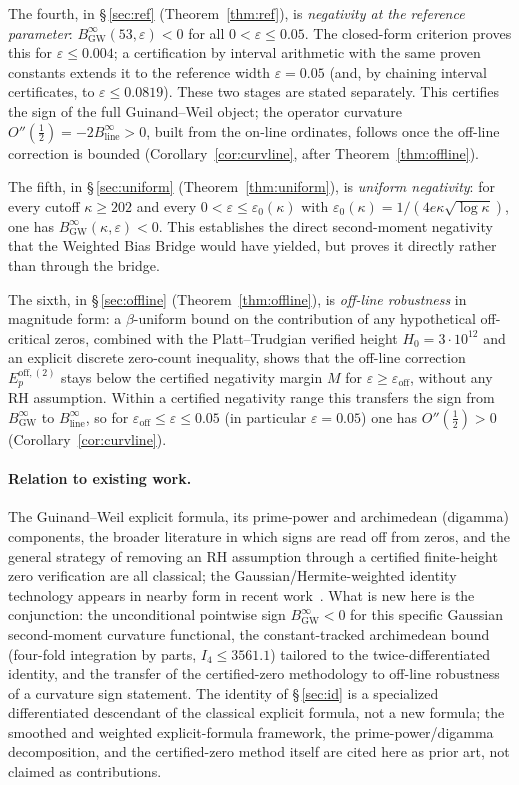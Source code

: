 \documentclass[11pt]{article}
\newcommand{\BinfGW}{B_{\mathrm{GW}}^{\infty}}   %
\newcommand{\Binfline}{B_{\mathrm{line}}^{\infty}} %
\newcommand{\Eoff}{E_p^{\mathrm{off},(2)}}  %
\begin{document}
The fourth, in \S\,\ref{sec:ref} (Theorem~\ref{thm:ref}), is
\emph{negativity at the reference parameter}: $\BinfGW(53,\varepsilon)<0$ for
all $0<\varepsilon\le 0.05$.
The closed-form criterion proves this for $\varepsilon\le 0.004$; a
certification by interval arithmetic with the same proven constants extends
it to the reference width $\varepsilon=0.05$ (and, by chaining interval
certificates, to $\varepsilon\le 0.0819$).
These two stages are stated separately.
This certifies the sign of the full Guinand--Weil object; the operator
curvature $O''(\tfrac12)=-2\Binfline>0$, built from the on-line ordinates,
follows once the off-line correction is bounded
(Corollary~\ref{cor:curvline}, after Theorem~\ref{thm:offline}).

The fifth, in \S\,\ref{sec:uniform} (Theorem~\ref{thm:uniform}), is
\emph{uniform negativity}: for every cutoff $\kappa\ge 202$ and every
$0<\varepsilon\le\varepsilon_0(\kappa)$ with
$\varepsilon_0(\kappa)=1/(4e\kappa\sqrt{\log\kappa})$, one has
$\BinfGW(\kappa,\varepsilon)<0$.
This establishes the direct second-moment negativity that the Weighted Bias
Bridge would have yielded, but proves it directly rather than through the
bridge.

The sixth, in \S\,\ref{sec:offline} (Theorem~\ref{thm:offline}), is
\emph{off-line robustness} in magnitude form: a $\beta$-uniform bound on
the contribution of any hypothetical off-critical zeros, combined with the
Platt--Trudgian verified height $H_0=3\cdot10^{12}$ and an explicit discrete
zero-count inequality, shows that the off-line correction $\Eoff$ stays
below the certified negativity margin $M$ for
$\varepsilon\ge\varepsilon_{\mathrm{off}}$, without any RH assumption. Within
a certified negativity range this transfers the sign from $\BinfGW$ to
$\Binfline$, so for $\varepsilon_{\mathrm{off}}\le\varepsilon\le 0.05$ (in
particular $\varepsilon=0.05$) one has $O''(\tfrac12)>0$
(Corollary~\ref{cor:curvline}).

\paragraph{Relation to existing work.}
The Guinand--Weil explicit formula, its prime-power and archimedean
(digamma) components, the broader literature in which signs are read off
from zeros, and the general strategy of removing an RH assumption through a
certified finite-height zero verification are all classical; the
Gaussian/Hermite-weighted identity technology appears in nearby form in
recent work~\cite{BalanzarioCardenas23}. What is new here is the
conjunction: the unconditional pointwise sign $\BinfGW<0$ for this specific
Gaussian second-moment curvature functional, the constant-tracked
archimedean bound (four-fold integration by parts, $I_4\le 3561.1$)
tailored to the twice-differentiated identity, and the transfer of the
certified-zero methodology to off-line robustness of a curvature sign
statement. The identity of \S\,\ref{sec:id} is a specialized differentiated
descendant of the classical explicit formula, not a new formula; the
smoothed and weighted explicit-formula framework, the prime-power/digamma
decomposition, and the certified-zero method itself are cited here as prior
art, not claimed as contributions.
\end{document}
